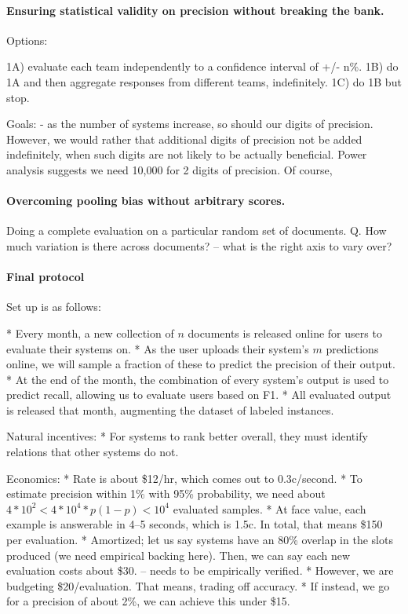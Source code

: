 \paragraph{Ensuring statistical validity on precision without breaking the bank.}

Options:

1A) evaluate each team independently to a confidence interval of +/- n\%.
1B) do 1A and then aggregate responses from different teams, indefinitely.
1C) do 1B but stop.

Goals:
- as the number of systems increase, so should our digits of precision. However, we would rather that additional digits of precision not be added indefinitely, when such digits are not likely to be actually beneficial.
Power analysis suggests we need 10,000 for 2 digits of precision. Of course, 
% 

\paragraph{Overcoming pooling bias without arbitrary scores.}

Doing a complete evaluation on a particular random set of documents.
Q. How much variation is there across documents? -- what is the right axis to vary over? 

\paragraph{Final protocol}



Set up is as follows:

* Every month, a new collection of $n$ documents is released online for users to evaluate their systems on.
* As the user uploads their system's $m$ predictions online, we will sample a fraction of these to predict the precision of their output.
* At the end of the month, the combination of every system's output is used to predict recall, allowing us to evaluate users based on F1.
* All evaluated output is released that month, augmenting the dataset of labeled instances.

Natural incentives:
* For systems to rank better overall, they must identify relations that other systems do not.

Economics:
  * Rate is about \$12/hr, which comes out to 0.3c/second.
  * To estimate precision within 1\% with 95\% probability, we need about $4*10^2 < 4 * 10^4 * p (1-p) < 10^4$ evaluated samples.
  * At face value, each example is answerable in 4--5 seconds, which is 1.5c. In total, that means \$150 per evaluation.
  * Amortized; let us say systems have an 80\% overlap in the slots produced (we need empirical backing here). Then, we can say each new evaluation costs about \$30. -- needs to be empirically verified.
  * However, we are budgeting \$20/evaluation. That means, trading off accuracy.
  * If instead, we go for a precision of about 2\%, we can achieve this under \$15.
